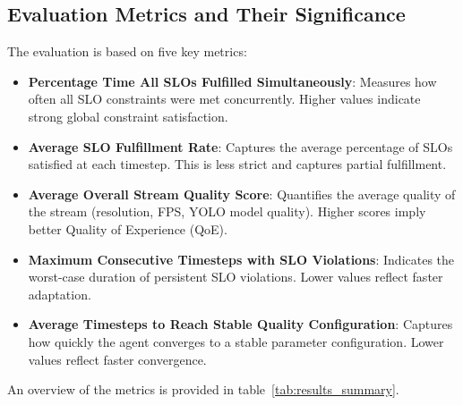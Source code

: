\subsection{Evaluation Metrics and Their Significance}

The evaluation is based on five key metrics:

\begin{itemize}
  \item \textbf{Percentage Time All SLOs Fulfilled Simultaneously}: Measures how often all SLO constraints were met concurrently. Higher values indicate strong global constraint satisfaction.
  \item \textbf{Average SLO Fulfillment Rate}: Captures the average percentage of SLOs satisfied at each timestep. This is less strict and captures partial fulfillment.
  \item \textbf{Average Overall Stream Quality Score}: Quantifies the average quality of the stream (resolution, FPS, YOLO model quality). Higher scores imply better Quality of Experience (QoE).
  \item \textbf{Maximum Consecutive Timesteps with SLO Violations}: Indicates the worst-case duration of persistent SLO violations. Lower values reflect faster adaptation.
  \item \textbf{Average Timesteps to Reach Stable Quality Configuration}: Captures how quickly the agent converges to a stable parameter configuration. Lower values reflect faster convergence.
\end{itemize}

An overview of the metrics is provided in table~\ref{tab:results_summary}.

